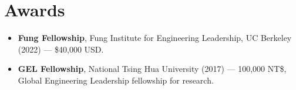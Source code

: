 \documentclass[10pt,letterpaper]{article}
\newcommand{\resumeItem}[1]{\item\small{#1\vspace{-2pt}}}
\begin{document}
\section{Awards}

\begin{itemize}
  \resumeItem{\textbf{Fung Fellowship}, Fung Institute for Engineering Leadership, UC Berkeley (2022) --- \$40,000 USD.}
  \resumeItem{\textbf{GEL Fellowship}, National Tsing Hua University (2017) --- 100,000 NT\$, Global Engineering Leadership fellowship for research.}
\end{itemize}
\end{document}
